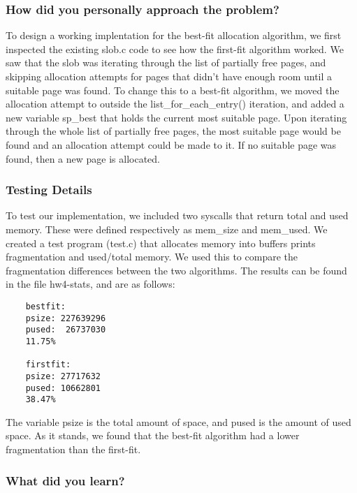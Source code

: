 \documentclass[journal, letterpaper, draftclsnofoot, onecolumn, 10pt]{IEEEtran}
\begin{document}
\subsubsection{How did you personally approach the problem?}



To design a working implentation for the best-fit allocation algorithm, we first inspected the existing slob.c code to see how the first-fit algorithm worked.
We saw that the slob was iterating through the list of partially free pages, and skipping allocation attempts for pages that didn't have enough room until a suitable page was found.
To change this to a best-fit algorithm, we moved the allocation attempt to outside the list\_for\_each\_entry() iteration, and added a new variable sp\_best that holds the current most suitable page.
Upon iterating through the whole list of partially free pages, the most suitable page would be found and an allocation attempt could be made to it. If no suitable page was found, then a new page is allocated. \\


\subsubsection{Testing Details}

To test our implementation, we included two syscalls that return total and used memory. These were defined respectively as mem\_size and mem\_used.
We created a test program (test.c) that allocates memory into buffers prints fragmentation and used/total memory. We used this to compare the fragmentation differences between the two algorithms.
The results can be found in the file hw4-stats, and are as follows: \\
\clearpage
\begin{verbatim}
    bestfit:
    psize: 227639296
    pused:  26737030
    11.75%

    firstfit:
    psize: 27717632
    pused: 10662801
    38.47%
\end{verbatim}

The variable psize is the total amount of space, and pused is the amount of used space. As it stands, we found that the best-fit algorithm had a lower fragmentation than the first-fit.\\

\subsubsection{What did you learn?}
\end{document}

